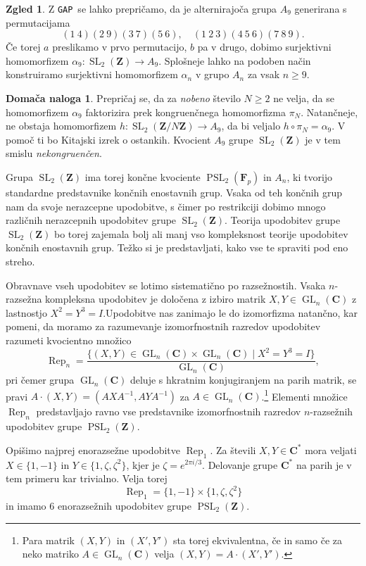 \documentclass[11pt]{book}
\def\ZZ{\mathbf{Z}}
\def\CC{\mathbf{C}}
\def\FF{\mathbf{F}}
\DeclareMathOperator\Rep{Rep}
\def\GAP{\texttt{GAP}}
\DeclareMathOperator\GL{GL}
\DeclareMathOperator\SL{SL}
\DeclareMathOperator\PSL{PSL}
\theoremstyle{definition}
\theoremstyle{zgled}
\newtheorem*{zgled}{Zgled}
\theoremstyle{odprtproblem}
\theoremstyle{domacanaloga}
\newtheorem*{domacanaloga}{Domača naloga}
\theoremstyle{izrek}
\begin{document}
\begin{zgled}
Z \GAP~se lahko prepričamo, da je alternirajoča grupa $A_9$ generirana s permutacijama
\[
    (1 \ 4)(2 \ 9)(3 \ 7)(5 \ 6), \quad
    (1 \ 2 \ 3)(4 \ 5 \ 6)(7 \ 8 \ 9).
\]
Če torej $a$ preslikamo v prvo permutacijo, $b$ pa v drugo, dobimo surjektivni homomorfizem $\alpha_9 \colon \SL_2(\ZZ) \to A_9$. Splošneje lahko na podoben način konstruiramo surjektivni homomorfizem $\alpha_n$ v grupo $A_n$ za vsak $n \geq 9$. 
\end{zgled}

\begin{domacanaloga}
Prepričaj se, da za \emph{nobeno} število $N \geq 2$ ne velja, da se homomorfizem $\alpha_9$ faktorizira prek kongruenčnega homomorfizma $\pi_N$. Natančneje, ne obstaja homomorfizem $h \colon \SL_2(\ZZ/N\ZZ) \to A_9$, da bi veljalo $h \circ \pi_N = \alpha_9$. V pomoč ti bo Kitajski izrek o ostankih. Kvocient $A_9$ grupe $\SL_2(\ZZ)$ je v tem smislu \emph{nekongruenčen}. 
\end{domacanaloga}

Grupa $\SL_2(\ZZ)$ ima torej končne kvociente $\PSL_2(\FF_p)$ in $A_n$, ki tvorijo standardne predstavnike končnih enostavnih grup. Vsaka od teh končnih grup nam da svoje nerazcepne upodobitve, s čimer po restrikciji dobimo mnogo različnih nerazcepnih upodobitev grupe $\SL_2(\ZZ)$. Teorija upodobitev grupe $\SL_2(\ZZ)$ bo torej zajemala bolj ali manj vso kompleksnost teorije upodobitev končnih enostavnih grup. Težko si je predstavljati, kako vse te spraviti pod eno streho.

Obravnave vseh upodobitev se lotimo sistematično po razsežnostih. Vsaka $n$-razsežna kompleksna upodobitev je določena z izbiro matrik $X,Y \in \GL_n(\CC)$ z lastnostjo $X^2 = Y^3 = I$.Upodobitve nas zanimajo le do izomorfizma natančno, kar pomeni, da moramo za razumevanje izomorfnostnih razredov upodobitev razumeti kvocientno množico
\[
    {\textstyle \Rep_n} = \frac{\{ (X, Y) \in \GL_n(\CC) \times \GL_n(\CC) \mid X^2 = Y^3 = I \}}
    {\GL_n(\CC)},
\]
pri čemer grupa $\GL_n(\CC)$ deluje s hkratnim konjugiranjem na parih matrik, se pravi $A \cdot (X,Y) = (A X A^{-1}, A Y A^{-1})$ za $A \in \GL_n(\CC)$.\footnote{Para matrik $(X,Y)$ in $(X', Y')$ sta torej ekvivalentna, če in samo če za neko matriko $A \in \GL_n(\CC)$ velja $(X,Y) = A \cdot (X', Y')$.} Elementi množice $\Rep_n$ predstavljajo ravno vse predstavnike izomorfnostnih razredov $n$-razsežnih upodobitev grupe $\PSL_2(\ZZ)$.

Opišimo najprej enorazsežne upodobitve $\Rep_1$. Za števili $X,Y \in \CC^*$ mora veljati $X \in \{1, -1 \}$ in $Y \in \{ 1, \zeta, \zeta^2 \}$, kjer je $\zeta = e^{2 \pi i / 3}$. Delovanje grupe $\CC^*$ na parih je v tem primeru kar trivialno. Velja torej
\[
  \textstyle \Rep_1 = \{ 1, -1 \} \times \{ 1, \zeta, \zeta^2 \}
\]
in imamo $6$ enorazsežnih upodobitev grupe $\PSL_2(\ZZ)$.
\end{document}
